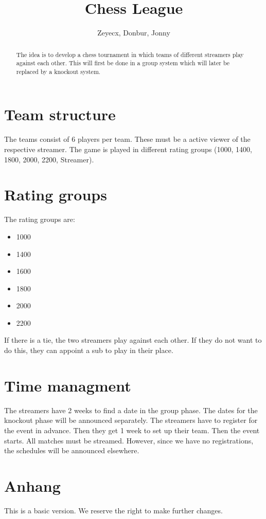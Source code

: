 \documentclass[preprint,12pt]{elsarticle}
\begin{document}
	
\begin{frontmatter}
			
\title{Chess League}
		
		
\author{Zeyecx, Donbur, Jonny}
		
\address{German Paper}
	 
\begin{abstract}
	The idea is to develop a chess tournament in which teams of different streamers play against each other.
	This will first be done in a group system which will later be replaced by a knockout system. 
\end{abstract}
\end{frontmatter}

\section{Team structure}
The teams consist of 6 players per team. These must be a active viewer of the respective streamer. 
The game is played in different rating groups (1000, 1400, 1800, 2000, 2200, Streamer).

\section{Rating groups}

The rating groups are:
\begin{itemize}
	\item 1000
	\item 1400 
	\item 1600
	\item 1800
	\item 2000
	\item 2200
\end{itemize}
If there is a tie, the two streamers play against each other. If they do not want to do this, they can appoint a sub to play in their place.

\section{Time managment}
The streamers have 2 weeks to find a date in the group phase. The dates for the knockout phase will be announced separately.
The streamers have to register for the event in advance. Then they get 1 week to set up their team.
Then the event starts.
All matches must be streamed.
However, since we have no registrations, the schedules will be announced elsewhere.


\section{Anhang}
This is a basic version. We reserve the right to make further changes.




\end{document}
